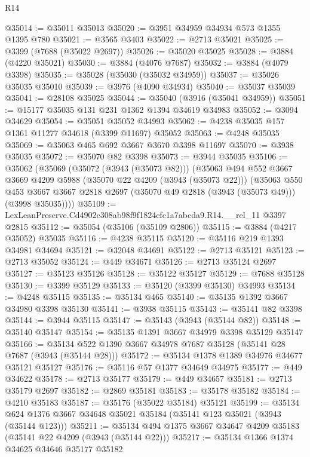 \begin{lexlean}{R14}
\begin{coremodule}
@35014 := @35011 @35013
@35020 := @3951 @34959 @34934 @573 @1355 @1395 @780
@35021 := @3565 @3403
@35022 := @2713 @35021
@35025 := @3399 (@7688 (@35022 @2697))
@35026 := @35020 @35025
@35028 := @3884 (@4220 @35021)
@35030 := @3884 (@4076 @7687)
@35032 := @3884 (@4079 @3398)
@35035 := @35028 (@35030 (@35032 @34959))
@35037 := @35026 @35035 @35010
@35039 := @3976 (@4090 @34934)
@35040 := @35037 @35039
@35041 := @28108 @35025
@35044 := @35040 (@3916 (@35041 @34959))
@35051 := @15177 @35035 @131 @231 @1362 @1394 @34619 @34983
@35052 := @3094 @34629
@35054 := @35051 @35052 @34993
@35062 := @4238 @35035 @157 @1361 @11277 @34618 (@3399 @11697) @35052
@35063 := @4248 @35035
@35069 := @35063 @465 @692 @3667 @3670 @3398 @11697
@35070 := @3938 @35035
@35072 := @35070 @82 @3398
@35073 := @3944 @35035
@35106 := @35062
    (@35069
      (@35072 (@3943 (@35073 @82)))
      (@35063
        @494
        @552
        @3667
        @3669
        @4209
        @5988
        (@35070 @22 @4209 (@3943 (@35073 @22)))
        (@35063
          @550
          @453
          @3667
          @3667
          @2818
          @2697
          (@35070 @49 @2818 (@3943 (@35073 @49)))
          (@3998 @35035))))
@35109 := LexLeanPreserve.Cd4902c308ab98f9f1824cfc1a7abcda9.R14.__rel_11 @3397 @2815
@35112 := @35054 (@35106 (@35109 @2806))
@35115 := @3884 (@4217 @35052) @35035
@35116 := @4238 @35115
@35120 := @35116 @219 @1393 @34981 @34694
@35121 := @32048 @34691
@35122 := @2713 @35121
@35123 := @2713 @35052
@35124 := @449 @34671
@35126 := @2713 @35124 @2697
@35127 := @35123 @35126
@35128 := @35122 @35127
@35129 := @7688 @35128
@35130 := @3399 @35129
@35133 := @35120 (@3399 @35130) @34993
@35134 := @4248 @35115
@35135 := @35134 @465
@35140 := @35135 @1392 @3667 @34980 @3398 @35130
@35141 := @3938 @35115
@35143 := @35141 @82 @3398
@35144 := @3944 @35115
@35147 := @35143 (@3943 (@35144 @82))
@35148 := @35140 @35147
@35154 := @35135 @1391 @3667 @34979 @3398 @35129 @35147
@35166 := @35134 @522 @1390 @3667 @34978 @7687 @35128 (@35141 @28 @7687 (@3943 (@35144 @28)))
@35172 := @35134 @1378 @1389 @34976 @34677 @35121 @35127
@35176 := @35116 @57 @1377 @34649 @34975
@35177 := @449 @34622
@35178 := @2713 @35177
@35179 := @449 @34657
@35181 := @2713 @35179 @2697
@35182 := @2869 @35181
@35183 := @35178 @35182
@35184 := @4210 @35183
@35187 := @35176 (@35022 @35184) @35121
@35199 := @35134 @624 @1376 @3667 @34648 @35021 @35184 (@35141 @123 @35021 (@3943 (@35144 @123)))
@35211 := @35134 @494 @1375 @3667 @34647 @4209 @35183 (@35141 @22 @4209 (@3943 (@35144 @22)))
@35217 := @35134 @1366 @1374 @34625 @34646 @35177 @35182

\end{coremodule}
\end{lexlean}
